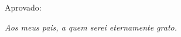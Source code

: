 \documentclass[
	12pt,		%
    openright, 	%
    oneside,	%
    a4paper,	%
	french,				%
	spanish,			%
	english,				%
    brazil,				%
]{abntex2}
\begin{document}

%
% 
%
 \begin{folhadeaprovacao}

   \begin{center}
     {\ABNTEXchapterfont\large\imprimirautor}

     \vspace*{\fill}\vspace*{\fill}
     {\ABNTEXchapterfont\bfseries\Large\imprimirtitulo}
     \vspace*{\fill}
    
     \hspace{.45\textwidth}
     \begin{minipage}{.5\textwidth}
         \imprimirpreambulo
     \end{minipage}%
     \vspace*{\fill}
    \end{center}
    
    
    Aprovado: 

 	
 	\vfill
 	     
    \begin{center}
     {\large\imprimirlocal}
     \par
     {\large\imprimirdata}
   \end{center}
  
 \end{folhadeaprovacao}

\begin{dedicatoria}
   \vspace*{\fill}
   \centering
   \noindent
   \textit{ Aos meus pais, a quem serei eternamente grato. } \vspace*{\fill}
\end{dedicatoria}
\end{document}
